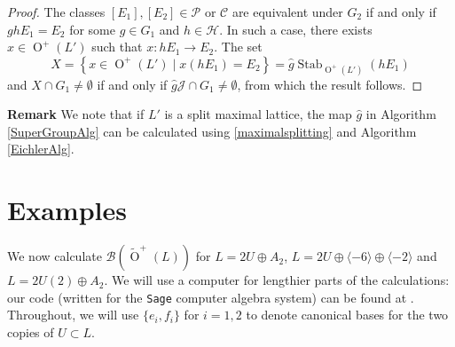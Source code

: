 \documentclass[12pt, a4paper]{article}
\newcommand{\ttt}{\texttt}
\newcommand{\la}{\langle}
\newcommand{\ra}{\rangle}
\newcommand{\beq}{\begin{equation*}}
\newcommand{\eeq}{\end{equation*}}
\newcommand{\bc}{\mathcal{B}}
\newcommand{\cc}{\mathcal{C}}
\newcommand{\hc}{\mathcal{H}}
\newcommand{\jc}{\mathcal{J}}
\newcommand{\pc}{\mathcal{P}}
\newcommand{\opn}{\operatorname}
\newcommand{\op}{\oplus}
\newcommand{\otl}{\widetilde{\opn{O}}^+(L)}
\begin{document}
\begin{proof}
  The classes $[E_1], [E_2] \in \pc$ or $\cc$ are equivalent under $G_2$ if and only if $ghE_1 = E_2$ for some $g \in G_1$ and $h \in \hc$.
  In such a case, there exists $x \in \opn{O}^+(L')$ such that $x:hE_1 \rightarrow E_2$.
  The set
  \beq
  X=\left \{ x \in \opn{O}^+(L') \mid x(hE_1) = E_2 \right \}
  =
  \hat{g} \opn{Stab}_{\opn{O}^+(L')}(hE_1)
  \eeq
  and $X \cap G_1 \neq \emptyset$ if and only if $\hat{g} \jc \cap G_1 \neq \emptyset$, from which the result follows.
\end{proof}
\noindent \textbf{Remark} We note that if $L'$ is a split maximal lattice, the map $\hat{g}$ in Algorithm \ref{SuperGroupAlg} can be calculated using \eqref{maximalsplitting} and Algorithm \ref{EichlerAlg}. 


 \section{Examples}\label{ExampleSection}
We now calculate $\bc(\otl)$ for
$L=2U \op A_2$,
$L=2U \op \la -6 \ra \op \la -2 \ra$ and
$L=2 U(2) \op A_2$.
We will use a computer for lengthier parts of the calculations: our code (written for the \ttt{Sage} computer algebra system) can be found at \cite{boundary}.
Throughout, we will use $\{e_i, f_i \}$ for $i=1,2$ to denote canonical bases for the two copies of $U \subset L$.
\end{document}
